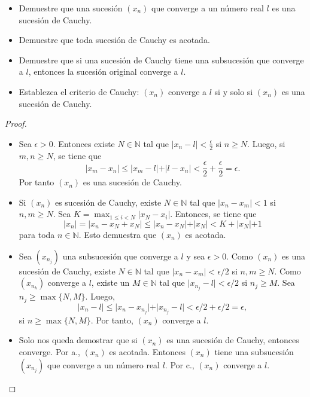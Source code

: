 \documentclass[12pt]{article}
\newcommand{\N}{\mathbb{N}}
\newenvironment{problem}[2][Problema]{\begin{trivlist}
\item[\hskip \labelsep {\bfseries #1}\hskip \labelsep {\bfseries #2.}]}{\end{trivlist}}
\begin{document}
\begin{problem}{10}
\text{ }
\begin{itemize}
    \item[a.] Demuestre que una sucesión $(x_n)$ que converge a un número real $l$ es una sucesión de Cauchy.
    \item[b.] Demuestre que toda sucesión de Cauchy es acotada. 
    \item[c.] Demuestre que si una sucesión de Cauchy tiene una subsucesión que converge a $l$, entonces la sucesión original converge a $l$.
    \item[d.] Establezca el criterio de Cauchy: $(x_n)$ converge a $l$ si y solo si $(x_n)$ es una sucesión de Cauchy. 
\end{itemize}

\end{problem}
\begin{proof}
\text{ }
\begin{itemize}
    \item[a.] Sea $\epsilon > 0$. Entonces existe $N \in \N$ tal que $\lvert x_n - l \lvert < \frac{\epsilon}{2}$ si $n \geq N$. Luego, si $m, n \geq N$, se tiene que 
    $$\lvert x_m - x_n \lvert \leq \lvert x_m - l \lvert + \lvert l - x_n \lvert < \frac{\epsilon}{2} + \frac{\epsilon}{2} = \epsilon. $$
    Por tanto $(x_n) $ es una sucesión de Cauchy.
    \item[b.] Si $(x_n)$ es sucesión de Cauchy, existe $N \in \N$ tal que $\lvert x_n - x_m \lvert < 1$ si $n, m \geq N$. Sea $K = \max_{1 \leq i < N} \lvert x_N - x_i \lvert$. Entonces, se tiene que 
    $$\lvert x_n \lvert = \lvert x_n - x_N + x_N \lvert \leq \lvert x_n - x_N \lvert + \lvert x_N \lvert  < K + \lvert x_N \lvert  + 1$$ 
    para toda $n \in \N$. Esto demuestra que $(x_n)$ es acotada.
    \item[c.] Sea $(x_{n_j})$ una subsucesión que converge a $l$ y sea $\epsilon > 0.$ Como $(x_n)$ es una sucesión de Cauchy, existe $N \in \N$ tal que $\lvert x_n - x_m \lvert < \epsilon/2$ si $n, m \geq N$. Como $(x_{n_k})$ converge a $l$, existe un $M\in \N$ tal que $\lvert x_{n_j} - l \lvert < \epsilon/2$ si $n_j \geq M$. Sea $n_j \geq \max\{N, M\}$. Luego,
    $$\lvert x_n - l \lvert \leq \lvert x_n - x_{n_j} \lvert + \lvert x_{n_j} - l \lvert < \epsilon/2 + \epsilon/2 = \epsilon, $$
    si $n \geq \max\{N, M\}.$ Por tanto, $(x_n)$ converge a $l$.
    
    \item[d.] Solo nos queda demostrar que si $(x_n)$ es una sucesión de Cauchy, entonces converge. Por a., $(x_n)$ es acotada. Entonces $(x_n)$ tiene una subsucesión $(x_{n_j})$ que converge a un número real $l$. Por c., $(x_n)$ converge a $l$.
 \end{itemize}

\end{proof}
\end{document}
